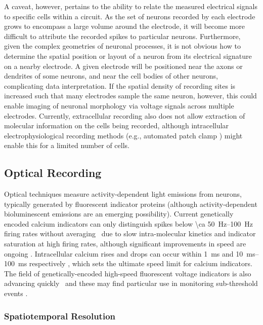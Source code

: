 A caveat, however, pertains to the ability to relate the measured electrical signals to specific cells within a circuit.
As the set of neurons recorded by each electrode grows to encompass a large volume around the electrode, it will become more difficult to attribute the recorded spikes to particular neurons.
Furthermore, given the complex geometries of neuronal processes, it is not obvious how to determine the spatial position or layout of a neuron from its electrical signature on a nearby electrode. A given electrode will be positioned near the axons or dendrites of some neurons, and near the cell bodies of other neurons, complicating data interpretation. If the spatial density of recording sites is increased such that many electrodes sample the same neuron, however, this could enable imaging of neuronal morphology via voltage signals across multiple electrodes. Currently, extracellular recording also does not allow extraction of molecular information on the cells being recorded, although intracellular electrophysiological recording methods (e.g., automated patch clamp \cite{Kodandaramaiah2012}) might enable this for a limited number of cells.

\subsection{Optical Recording}

Optical techniques measure activity-dependent light emissions from neurons, typically generated by fluorescent indicator proteins (although activity-dependent bioluminescent emissions are an emerging possibility).
Current genetically encoded calcium indicators can only distinguish spikes below \SIrange{\ca 50}{100}{\hertz} firing rates without averaging~\cite{Smetters99} due to slow intra-molecular kinetics and indicator saturation at high firing rates, although significant improvements in speed are ongoing \cite{sun2013fast}. Intracellular calcium rises and drops can occur within \SI{1}{\milli\second} and \SIrange{10}{100}{\milli\second} respectively \cite{higley2008calcium}, which sets the ultimate speed limit for calcium indicators. The field of genetically-encoded high-speed fluorescent voltage indicators is also advancing quickly~\cite{Barnett2012, Kralj2012,gong2013enhanced, Storace2013, cao2013genetically} and these may find particular use in monitoring sub-threshold events \cite{scanziani2009electrophysiology}.

\subsubsection{Spatiotemporal Resolution}

